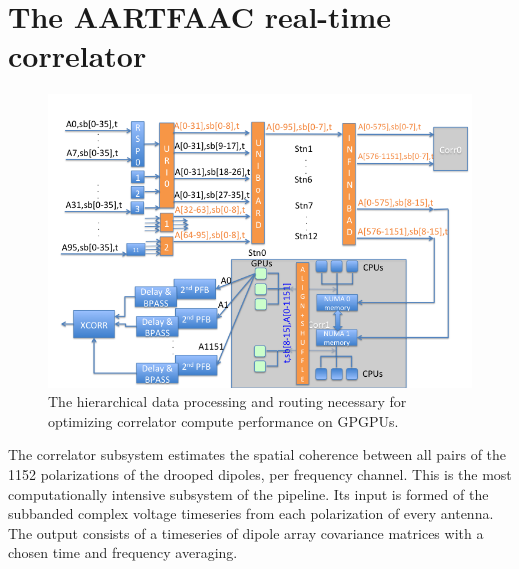 \documentclass{ws-jai}
\begin{document}

\section {\label{sec:gpucorr} The AARTFAAC real-time correlator}
\begin{figure}[htbp]
\centering
\includegraphics[width=1\textwidth]{Figs/data_routing_transform_hierarchy/Slide1.png}
\caption{The hierarchical data processing and routing necessary for optimizing correlator compute performance on GPGPUs.}
\label{fig:afaac_station_hw}
\end{figure}

The correlator  subsystem estimates the  spatial coherence between all  pairs of
the 1152 polarizations  of the drooped dipoles, per frequency  channel.  This is
the  most computationally  intensive subsystem  of the  pipeline.  Its  input is
formed of  the subbanded  complex voltage timeseries  from each  polarization of
every antenna.  The  output consists of a timeseries of  dipole array covariance
matrices with a chosen time and frequency averaging.
\end{document}
